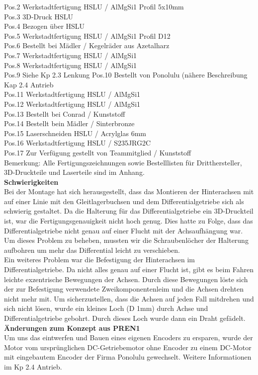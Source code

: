 Pos.2 	Werkstadtfertigung HSLU / AlMgSi1 Profil 5x10mm\\
Pos.3 	3D-Druck HSLU\\
Pos.4 	Bezogen über HSLU\\
Pos.5 	Werkstadtfertigung HSLU / AlMgSi1 Profil D12\\
Pos.6 	Bestellt bei Mädler / Kegelräder aus Azetalharz\\
Pos.7 	Werkstadtfertigung HSLU / AlMgSi1\\
Pos.8	Werkstadtfertigung HSLU / AlMgSi1\\
Pos.9 	Siehe Kp 2.3 Lenkung
Pos.10	Bestellt von Ponolulu (nähere Beschreibung Kap 2.4 Antrieb\\
Pos.11	Werkstadtfertigung HSLU / AlMgSi1\\
Pos.12	Werkstadtfertigung HSLU / AlMgSi1\\
Pos.13	Bestellt bei Conrad / Kunststoff\\
Pos.14	Bestellt bein Mädler / Sinterbronze\\
Pos.15	Laserschneiden HSLU / Acrylglas 6mm\\
Pos.16	Werkstadtfertigung HSLU / S235JRG2C\\
Pos.17	Zur Verfügung gestellt von Teammitglied / Kunststoff\\[0.2cm]
Bemerkung: Alle Fertigungszeichnungen sowie Bestelllisten für Dritthersteller, 3D-Druckteile und Laserteile sind im Anhang.\\
\textbf{Schwierigkeiten}\\[0.2cm]
Bei der Montage hat sich herausgestellt, dass das Montieren der Hinterachsen mit auf einer Linie mit den Gleitlagerbuchsen und dem Differentialgetriebe sich als schwierig gestaltet. Da die Halterung für das Differentialgetriebe ein 3D-Druckteil ist, war die Fertigungsgenauigkeit nicht hoch genug. Dies hatte zu Folge, dass das Differentialgetriebe nicht genau auf einer Flucht mit der Achsaufhängung war. Um dieses Problem zu beheben, mussten wir die Schraubenlöcher der Halterung aufbohren um mehr das Differential leicht zu verschieben.\\
Ein weiteres Problem war die Befestigung der Hinterachsen im Differentialgetriebe. Da nicht alles genau auf einer Flucht ist, gibt es beim Fahren leichte exzentrische Bewegungen der Achsen. Durch diese Bewegungen löste sich der zur Befestigung verwendete Zweikomponentenleim und die Achsen drehten nicht mehr mit. Um sicherzustellen, dass die Achsen auf jeden Fall mitdrehen und sich nicht lösen, wurde ein kleines Loch (D 1mm) durch Achse und Differentialgetriebe gebohrt. Durch dieses Loch wurde dann ein Draht gefädelt.\\[0.2cm] 
\textbf{Änderungen zum Konzept aus PREN1}\\[0.2cm]
Um uns das eintwerfen und Bauen eines eigenen Encoders zu ersparen, wurde der Motor vom ursprünglichen DC-Getriebemotor ohne Encoder zu einem DC-Motor mit eingebautem Encoder der Firma Ponolulu gewechselt. Weitere Informationen im Kp 2.4 Antrieb.
